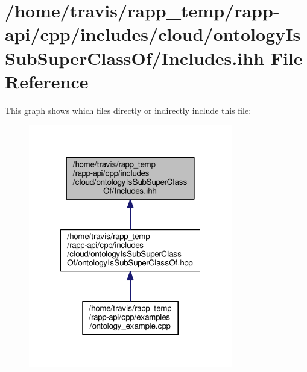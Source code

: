 \hypertarget{cloud_2ontologyIsSubSuperClassOf_2Includes_8ihh}{\section{/home/travis/rapp\-\_\-temp/rapp-\/api/cpp/includes/cloud/ontology\-Is\-Sub\-Super\-Class\-Of/\-Includes.ihh File Reference}
\label{cloud_2ontologyIsSubSuperClassOf_2Includes_8ihh}
}
This graph shows which files directly or indirectly include this file\-:
\nopagebreak
\begin{figure}[H]
\begin{center}
\leavevmode
\includegraphics[width=252pt]{cloud_2ontologyIsSubSuperClassOf_2Includes_8ihh__dep__incl}
\end{center}
\end{figure}

